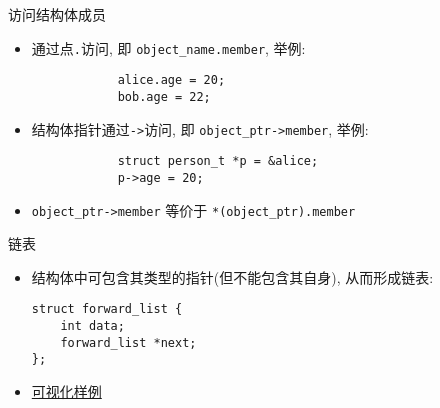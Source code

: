 \begin{frame}[fragile]{访问结构体成员}
    \begin{itemize}[<+- | alert@+>]
        \item 通过点\texttt{.}访问, 即 \texttt{object\_name.member}, 举例:
        \begin{verbatim}
            alice.age = 20;
            bob.age = 22;
        \end{verbatim}
        \item 结构体指针通过\texttt{->}访问, 即 \texttt{object\_ptr->member}, 举例:
        \begin{verbatim}
            struct person_t *p = &alice;
            p->age = 20;
        \end{verbatim}
        \item \texttt{object\_ptr->member} 等价于 \texttt{*(object\_ptr).member}
    \end{itemize}
\end{frame}

\begin{frame}[fragile]{链表}
    \begin{itemize}[<+- | alert@+>]
        \item 结构体中可包含其类型的指针(但不能包含其自身), 从而形成链表:
        \begin{verbatim}
struct forward_list {
    int data;
    forward_list *next;
};
        \end{verbatim}
        \item \href{http://pythontutor.com/c.html#code=\%23include\%20\%3Cstdio.h\%3E\%0A\%23include\%20\%3Cstdlib.h\%3E\%0A\%0Astruct\%20forward_list\%20\%7B\%0A\%20\%20int\%20data\%3B\%0A\%20\%20struct\%20forward_list\%20*next\%3B\%0A\%7D\%20_head,\%20*head\%20\%3D\%20\%26_head,\%20*tail\%20\%3D\%20\%26_head\%3B\%0A\%0Atypedef\%20struct\%20forward_list\%20forward_list\%3B\%0A\%0Aint\%20main\%28\%29\%20\%7B\%0A\%20\%20for\%20\%28int\%20i\%20\%3D\%200\%3B\%20i\%20\%3C\%203\%3B\%20\%2B\%2Bi\%29\%20\%7B\%0A\%20\%20\%20\%20tail-\%3Enext\%20\%3D\%20\%28forward_list\%20*\%29malloc\%28sizeof\%28forward_list\%29\%29\%3B\%0A\%20\%20\%20\%20tail\%20\%3D\%20tail-\%3Enext\%3B\%0A\%20\%20\%20\%20tail-\%3Edata\%20\%3D\%20i\%3B\%0A\%20\%20\%20\%20tail-\%3Enext\%20\%3D\%20NULL\%3B\%0A\%20\%20\%7D\%0A\%20\%20for\%20\%28forward_list\%20*p\%20\%3D\%20head-\%3Enext,\%20*q\%20\%3D\%20p\%3B\%20p\%20!\%3D\%20NULL\%3B\%20q\%20\%3D\%20p\%29\%20\%7B\%0A\%20\%20\%20\%20printf\%28\%22\%25d\%5Cn\%22,\%20p-\%3Edata\%29\%3B\%0A\%20\%20\%20\%20p\%20\%3D\%20p-\%3Enext\%3B\%0A\%20\%20\%20\%20free\%28q\%29\%3B\%0A\%20\%20\%20\%20head-\%3Enext\%20\%3D\%20p\%3B\%0A\%20\%20\%20\%20if\%20\%28tail\%20\%3D\%3D\%20q\%29\%0A\%20\%20\%20\%20\%20\%20tail\%20\%3D\%20head\%3B\%0A\%20\%20\%7D\%0A\%7D&mode=edit&origin=opt-frontend.js&py=c&rawInputLstJSON=\%5B\%5D}{可视化样例}
    \end{itemize}
\end{frame}

